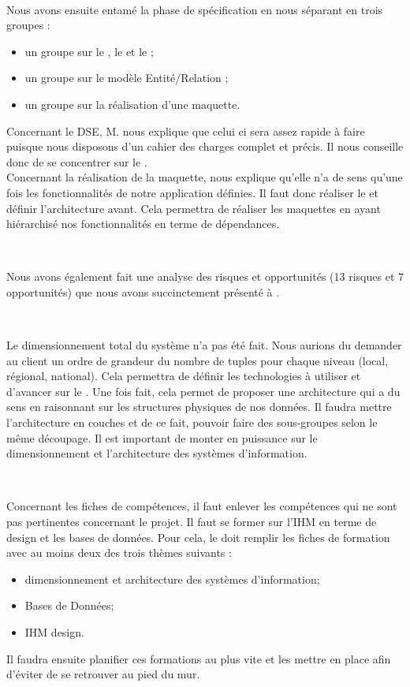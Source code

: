 \documentclass [a4paper] {article}
\begin{document}
~

Nous avons ensuite entamé la phase de spécification en nous séparant en trois groupes : 
\begin{itemize}
\item un groupe sur le \DSE{}, le \DSI{} et le \PTV{} ; 
\item un groupe sur le modèle Entité/Relation ;
\item un groupe sur la réalisation d'une maquette.
\end{itemize}

Concernant le DSE, M. \nomTuteurPedago{} nous explique que celui ci sera assez rapide à faire puisque nous disposons d'un cahier des charges complet et précis. Il nous conseille donc de se concentrer sur le \PTV{}.
\\
Concernant la réalisation de la maquette, \nomTuteurPedago{} nous explique qu'elle n'a de sens qu'une fois les fonctionnalités de notre application définies. Il faut donc réaliser le \DSICourt{} et définir l'architecture avant. Cela permettra de réaliser les maquettes en ayant hiérarchisé nos fonctionnalités en terme de dépendances.

~

Nous avons également fait une analyse des risques et opportunités (13 risques et 7 opportunités) que nous avons succinctement présenté à \nomTuteurPedago{}.

~

Le dimensionnement total du système n'a pas été fait. Nous aurions du demander au client un ordre de grandeur du nombre de tuples pour chaque niveau (local, régional, national). Cela permettra de définir les technologies à utiliser et d'avancer sur le \DSICourt{}. Une fois fait, cela permet de proposer une architecture qui a du sens en raisonnant sur les structures physiques de nos données. Il faudra mettre l'architecture en couches et de ce fait, pouvoir faire des sous-groupes selon le même découpage. Il est important de monter en puissance sur le dimensionnement et l'architecture des systèmes d'information.

~

Concernant les fiches de compétences, il faut enlever les compétences qui ne sont pas pertinentes concernant le projet. Il faut se former sur l'IHM en terme de design et les bases de données. Pour cela, le \RQCourt{} doit remplir les fiches de formation avec au moins deux des trois thèmes suivants :
\begin{itemize}
\item dimensionnement et architecture des systèmes d'information;
\item Bases de Données;
\item IHM design.
\end{itemize}
Il faudra ensuite planifier ces formations au plus vite et les mettre en place afin d'éviter de se retrouver au pied du mur.
\end{document}
